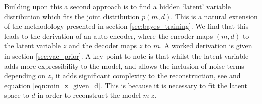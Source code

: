 \documentclass[12pt]{article}
\begin{document}
Building upon this a second approach  is to find a hidden `latent' variable distribution which fits the joint distribution $p(m,d)$. This is a natural extension of the methodology presented in section \ref{sec:bayes_training}. We find that this leads to the derivation of an auto-encoder, where the encoder maps $(m,d)$ to the latent variable $z$ and the decoder maps $z$ to $m$. A worked derivation is given in section \ref{sec:vae_prior}. A key point to note is that whilst the latent variable adds more expressibility to the model, and allows the inclusion of noise terms depending on $z$, it adds significant complexity to the reconstruction, see \cite{bora} and equation \ref{eqn:min_z_given_d}. This is because it is necessary to fit the latent space to $d$ in order to reconstruct the model $m|z$. 
\end{document}

